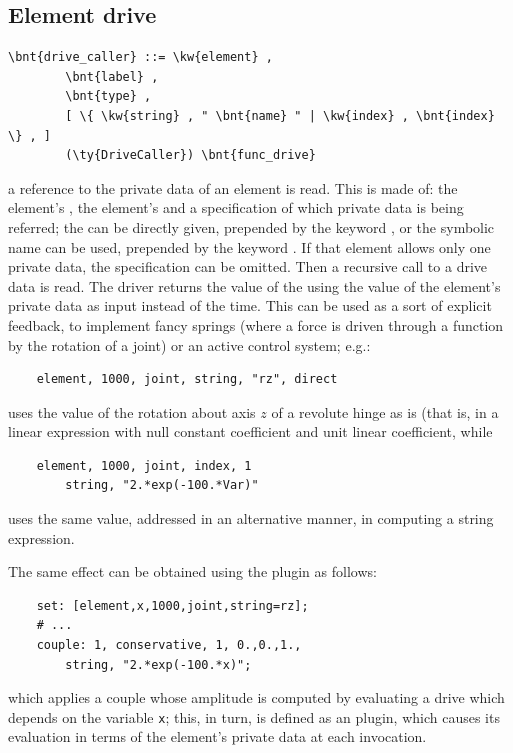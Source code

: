 \subsection{Element drive}\label{sec:DRIVE:ELEMENT}
\begin{Verbatim}[commandchars=\\\{\}]
    \bnt{drive_caller} ::= \kw{element} ,
        \bnt{label} ,
        \bnt{type} ,
        [ \{ \kw{string} , " \bnt{name} " | \kw{index} , \bnt{index} \} , ]
        (\ty{DriveCaller}) \bnt{func_drive}
\end{Verbatim}
a reference to the private data of an element is read.
This is made of: the element's , the element's 
and a specification of which private data is being referred;
the  can be directly given, prepended by the keyword
, or the symbolic name  can be used, prepended by 
the keyword .
If that element allows only one private data, the specification 
can be omitted.
Then a recursive call to a drive data is read. 
The driver returns the value of the  
 using the value of the 
element's private data as input instead of the time. 
This can be used as a sort of explicit feedback, to implement fancy
springs (where a force is driven through a function by the rotation
of a joint) or an active control system; e.g.:
\begin{verbatim}
    element, 1000, joint, string, "rz", direct
\end{verbatim}
uses the value of the rotation about axis $z$ of a revolute hinge
as is (that is, in a linear expression with null constant coefficient 
and unit linear coefficient, while
\begin{verbatim}
    element, 1000, joint, index, 1
        string, "2.*exp(-100.*Var)"
\end{verbatim}
uses the same value, addressed in an alternative manner, in computing
a string expression.

The same effect can be obtained using the  plugin as follows:
\begin{verbatim}
    set: [element,x,1000,joint,string=rz];
    # ...
    couple: 1, conservative, 1, 0.,0.,1.,
        string, "2.*exp(-100.*x)";
\end{verbatim}
which applies a couple whose amplitude is computed by evaluating
a  drive which depends on the variable \texttt{x}; this, in turn,
is defined as an  plugin, which causes its evaluation
in terms of the element's private data at each invocation.

